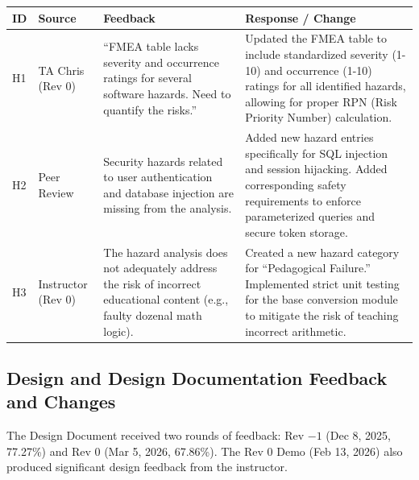 \documentclass{article}
\begin{document}
\begin{longtable}{p{} p{} p{} p{}}
\toprule
\textbf{ID} & \textbf{Source} & \textbf{Feedback} & \textbf{Response / Change} \\
\midrule
\endhead
\bottomrule
\endfoot

H1 & TA Chris (Rev 0) & ``FMEA table lacks severity and occurrence ratings for several software hazards. Need to quantify the risks.'' & Updated the FMEA table to include standardized severity (1-10) and occurrence (1-10) ratings for all identified hazards, allowing for proper RPN (Risk Priority Number) calculation. \\
\midrule

H2 & Peer Review & Security hazards related to user authentication and database injection are missing from the analysis. & Added new hazard entries specifically for SQL injection and session hijacking. Added corresponding safety requirements to enforce parameterized queries and secure token storage. \\
\midrule

H3 & Instructor (Rev 0) & The hazard analysis does not adequately address the risk of incorrect educational content (e.g., faulty dozenal math logic). & Created a new hazard category for ``Pedagogical Failure.'' Implemented strict unit testing for the base conversion module to mitigate the risk of teaching incorrect arithmetic. \\

\end{longtable}

\subsection{Design and Design Documentation Feedback and Changes}

The Design Document received two rounds of feedback: Rev $-1$ (Dec 8, 2025, 77.27\%) and Rev 0 (Mar 5, 2026, 67.86\%). The Rev 0 Demo (Feb 13, 2026) also produced significant design feedback from the instructor.
\end{document}
